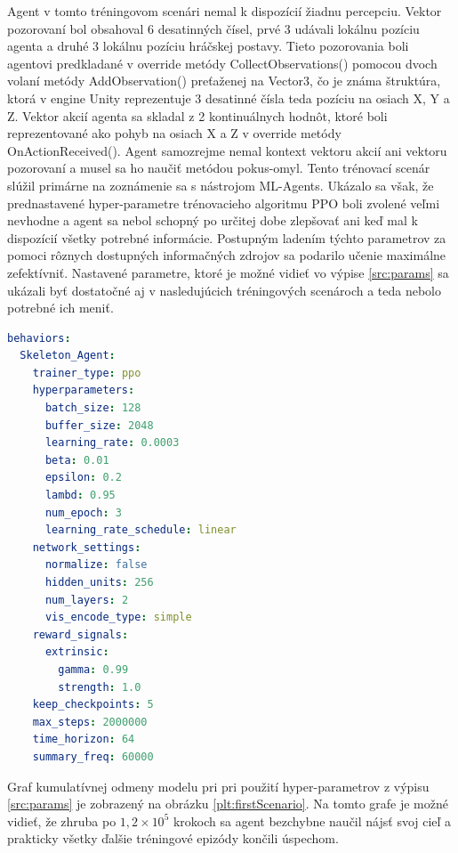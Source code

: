 \documentclass[slovak, master]{diploma}
\begin{document}
Agent v tomto tréningovom scenári nemal k dispozícií žiadnu percepciu. Vektor pozorovaní bol obsahoval 6 desatinných čísel, prvé 3 udávali lokálnu pozíciu agenta a druhé 3 lokálnu pozíciu hráčskej postavy. Tieto pozorovania boli agentovi predkladané v override metódy CollectObservations() pomocou dvoch volaní metódy AddObservation() preťaženej na Vector3, čo je známa štruktúra, ktorá v engine Unity reprezentuje 3 desatinné čísla teda pozíciu na osiach X, Y a Z. Vektor akcií agenta sa skladal z 2 kontinuálnych hodnôt, ktoré boli reprezentované ako pohyb na osiach X a Z v override metódy OnActionReceived(). Agent samozrejme nemal kontext vektoru akcií ani vektoru pozorovaní a musel sa ho naučiť metódou pokus-omyl.
Tento trénovací scenár slúžil primárne na zoznámenie sa s nástrojom ML-Agents. Ukázalo sa však, že prednastavené hyper-parametre trénovacieho algoritmu PPO boli zvolené veľmi nevhodne a agent sa nebol schopný po určitej dobe zlepšovať ani keď mal k dispozícií všetky potrebné informácie. Postupným ladením týchto parametrov za pomoci rôznych dostupných informačných zdrojov sa podarilo učenie maximálne zefektívniť. Nastavené parametre, ktoré je možné vidieť vo výpise \ref{src:params} sa ukázali byť dostatočné aj v nasledujúcich tréningových scenároch a teda nebolo potrebné ich meniť.

\vspace{8pt}
\begin{lstlisting}[language=yml,label=src:params,caption={Hyper-parametre PPO modelu využité pri tréninug NPC agenta Skeleton}]
behaviors:
  Skeleton_Agent:
    trainer_type: ppo
    hyperparameters:
      batch_size: 128
      buffer_size: 2048
      learning_rate: 0.0003
      beta: 0.01
      epsilon: 0.2
      lambd: 0.95
      num_epoch: 3
      learning_rate_schedule: linear
    network_settings:
      normalize: false
      hidden_units: 256
      num_layers: 2
      vis_encode_type: simple
    reward_signals:
      extrinsic:
        gamma: 0.99
        strength: 1.0
    keep_checkpoints: 5
    max_steps: 2000000
    time_horizon: 64
    summary_freq: 60000
\end{lstlisting}

Graf kumulatívnej odmeny modelu pri pri použití hyper-parametrov z výpisu \ref{src:params} je zobrazený na obrázku \ref{plt:firstScenario}. Na tomto grafe je možné vidieť, že zhruba po \(1,2 \times 10^5\) krokoch sa agent bezchybne naučil nájsť svoj cieľ a prakticky všetky ďalšie tréningové epizódy končili úspechom.
\end{document}
